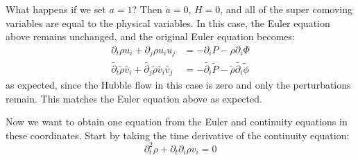 \documentclass{article}
\newcommand{ \wt }{\widetilde}
\newenvironment{aside}
  {\begin{mdframed}[style=0,%
      leftline=false,rightline=false,leftmargin=2em,rightmargin=2em,%
          innerleftmargin=0pt,innerrightmargin=0pt,linewidth=0.75pt,%
      skipabove=7pt,skipbelow=7pt]\small}
  {\end{mdframed}}
\begin{document}
\begin{aside}
What happens if we set $a=1$? Then $\dot{a}=0$, $H=0$, and all of the
super comoving variables are equal to the physical variables.  In this
case, the Euler equation above remains unchanged, and the original
Euler equation becomes:
\begin{align*}
  \partial_t \rho u_i + \partial_j \rho u_i u_j &= - \partial_i P -
  \rho \partial_i \Phi \\
\wt{\partial_t} \wt{\rho} \wt{v_i} + \wt{\partial_j} \wt{\rho} \wt{v_i} \wt{v_j} &= - \wt{\partial_i} \wt{P} - \wt{\rho} \wt{\partial_i} \wt{\phi}
\end{align*}
as expected, since the Hubble flow in this case is zero and only the
perturbations remain. This matches the Euler equation above as expected.
\end{aside}



Now we want to obtain one equation from the Euler and continuity equations in these coordinates.  Start by taking the time derivative of the continuity equation:
\begin{equation}
  \partial_t^2 \rho + \partial_t \partial_i \rho v_i = 0 
\end{equation}
\end{document}
